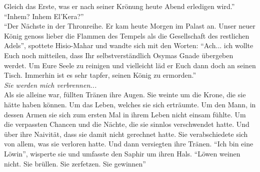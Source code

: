 Gleich das Erste, was er nach seiner Krönung heute Abend erledigen wird.''\\
``Inhem? Inhem El'Kera?''\\
``Der Nächste in der Thronreihe. Er kam heute Morgen im Palast an. Unser neuer König genoss lieber die Flammen des 
Tempels als die Gesellschaft des restlichen Adels'', spottete Hisio-Mahar und wandte sich mit den 
Worten: ``Ach... ich wollte Euch noch mitteilen, dass Ihr selbstverständlich Osymas Gnade übergeben 
werdet. Um Eure Seele zu reinigen und vielleicht läd er Euch dann doch an seinen Tisch. Immerhin 
ist es sehr tapfer, seinen König zu ermorden.''\\
\textit{Sie werden mich verbrennen...}\\
Als sie alleine war, füllten Tränen ihre Augen. Sie weinte um die Krone, die sie hätte haben 
können. Um das Leben, welches sie sich erträumte. Um den Mann, in dessen Armen sie sich zum ersten 
Mal in ihrem Leben nicht einsam fühlte. Um die verpassten Chancen und die Nächte, die sie sinnlos 
verschwendet hatte. Und über ihre Naivität, dass sie damit nicht gerechnet hatte. Sie 
verabschiedete sich von allem, was sie verloren hatte. Und dann versiegten ihre Tränen. ``Ich bin 
eine Löwin'', wisperte sie und umfasste den Saphir um ihren Hals. ``Löwen weinen nicht. Sie 
brüllen. Sie zerfetzen. Sie gewinnen''\\


